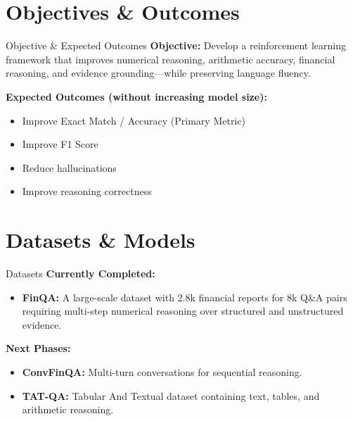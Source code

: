 \documentclass[aspectratio=169]{beamer}
\begin{document}
\section{Objectives \& Outcomes}
\begin{frame}{Objective \& Expected Outcomes}
    \textbf{Objective:} Develop a reinforcement learning framework that improves numerical reasoning, arithmetic accuracy, financial reasoning, and evidence grounding—while preserving language fluency.
    
    \vspace{0.3cm}
    \textbf{Expected Outcomes (without increasing model size):}
    \begin{itemize}
        \item Improve Exact Match / Accuracy (Primary Metric)
        \item Improve F1 Score
        \item Reduce hallucinations
        \item Improve reasoning correctness
    \end{itemize}
\end{frame}

\section{Datasets \& Models}
\begin{frame}{Datasets}
    \textbf{Currently Completed:}
    \begin{itemize}
        \item \textbf{FinQA:} A large-scale dataset with 2.8k financial reports for 8k Q\&A pairs requiring multi-step numerical reasoning over structured and unstructured evidence.
    \end{itemize}
    
    \vspace{0.3cm}
    \textbf{Next Phases:}
    \begin{itemize}
        \item \textbf{ConvFinQA:} Multi-turn conversations for sequential reasoning.
        \item \textbf{TAT-QA:} Tabular And Textual dataset containing text, tables, and arithmetic reasoning.
    \end{itemize}
\end{frame}
\end{document}
